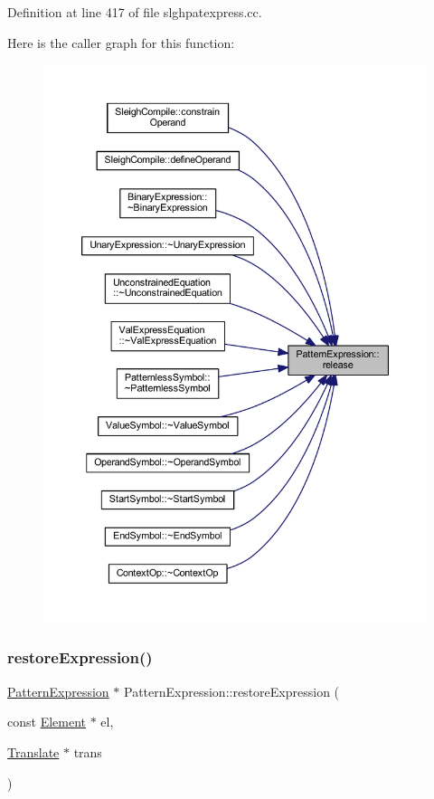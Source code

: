Definition at line 417 of file slghpatexpress.\+cc.

Here is the caller graph for this function\+:
\nopagebreak
\begin{figure}[H]
\begin{center}
\leavevmode
\includegraphics[width=350pt]{class_pattern_expression_a3528f68b2f3f8ff6a12a8650a949203c_icgraph}
\end{center}
\end{figure}
\mbox{\label{class_pattern_expression_a77a394eabbb5d76013c19e7bc3455ea5}} 
\subsubsection{\texorpdfstring{restoreExpression()}{restoreExpression()}}
{\footnotesize\ttfamily \mbox{\hyperlink{class_pattern_expression}{Pattern\+Expression}} $\ast$ Pattern\+Expression\+::restore\+Expression (\begin{DoxyParamCaption}\item[{const \mbox{\hyperlink{class_element}{Element}} $\ast$}]{el,  }\item[{\mbox{\hyperlink{class_translate}{Translate}} $\ast$}]{trans }\end{DoxyParamCaption})\hspace{0.3cm}{\ttfamily [static]}}



